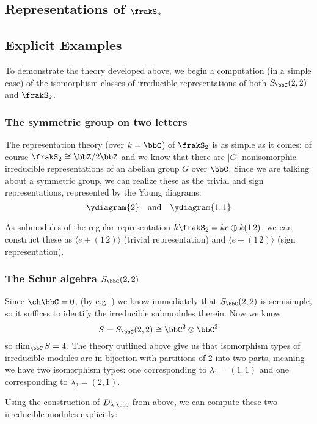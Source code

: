 \documentclass[12pt]{article}
\begin{document}
\subsection{Representations of \texorpdfstring{$\frakS_n$}{Sn}}

\subsection{Explicit Examples}
To demonstrate the theory developed above, we begin a computation (in a simple case) of the isomorphism classes of irreducible 
representations of both $S_\bbC(2,2)$ and $\frakS_2$.

\subsubsection{The symmetric group on two letters}
The representation theory (over $k=\bbC$) of $\frakS_2$ is as simple as it comes: of course $\frakS_2\cong \bbZ/2\bbZ$ and we know that 
there are $|G|$ nonisomorphic irreducible representations of an abelian group $G$ over $\bbC$. Since we are talking about a symmetric group, 
we can realize these as the trivial and sign representations, represented by the Young diagrams:
\[\ydiagram{2}\quad\text{and}\quad\ydiagram{1,1}\]

As submodules of the regular representation $k\frakS_2= k e\oplus k(1\,2)$, we can construct these as $\langle e+(1\, 2)\rangle$ (trivial representation) and $\langle e-(1\,2)\rangle$ (sign representation).

\subsubsection{The Schur algebra \texorpdfstring{$S_\bbC(2,2)$}{S(2,2)}}
Since $\ch\bbC=0$, (by e.g. \cite{schur-thesis}) we know immediately that $S_\bbC(2,2)$ is semisimple, so it suffices to identify the irreducible submodules therein.
Now we know 
\[S=S_\bbC(2,2)\cong \bbC^2\otimes\bbC^2\]
so $\dim_\bbC S=4.$ The theory outlined above give us that isomorphism types of irreducible modules are in bijection with partitions of 2 into two parts, meaning 
we have two isomorphism types: one corresponding to $\lambda_1=(1,1)$ and one corresponding to $\lambda_2=(2,1)$. 

Using the construction of $D_{\lambda,\bbC}$ from above, we can compute these two irreducible modules explicitly:
\end{document}
